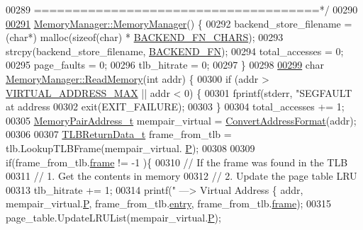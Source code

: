 \begin{DoxyCode}
{{{{{{{{{{{{{{{{{{{{{{00289 \textcolor{comment}{=====================================*/}
00290 
\hypertarget{memory_8cpp_source.tex_l00291}{}\hyperlink{classMemoryManager_ae925e8ad4d8fe6f0565e9d5729f59593}{00291} \hyperlink{classMemoryManager_ae925e8ad4d8fe6f0565e9d5729f59593}{MemoryManager::MemoryManager}() \{
00292     backend\_store\_filename = (\textcolor{keywordtype}{char}*) malloc(\textcolor{keyword}{sizeof}(\textcolor{keywordtype}{char}) * \hyperlink{memory_8h_a502fddf4e42292e4318a924b6b3b7759}{BACKEND\_FN\_CHARS});
00293     strcpy(backend\_store\_filename, \hyperlink{memory_8h_a478707addabe7b0aedaa632b70394d75}{BACKEND\_FN});
00294     total\_accesses = 0;
00295     page\_faults = 0;
00296     tlb\_hitrate = 0;
00297 \}
00298 
\hypertarget{memory_8cpp_source.tex_l00299}{}\hyperlink{classMemoryManager_a4a716fc46ee321ebb25bd54bcc9d0524}{00299} \textcolor{keywordtype}{char} \hyperlink{classMemoryManager_a4a716fc46ee321ebb25bd54bcc9d0524}{MemoryManager::ReadMemory}(\textcolor{keywordtype}{int} addr) \{
00300     \textcolor{keywordflow}{if} (addr > \hyperlink{memory_8h_a391c8595be4da3b3f1cd95918b89da2c}{VIRTUAL\_ADDRESS\_MAX} || addr < 0) \{
00301         fprintf(stderr, \textcolor{stringliteral}{"SEGFAULT at address %
00302         exit(EXIT\_FAILURE);
00303     \}
00304     total\_accesses += 1;
00305     \hyperlink{structMemoryPairAddress__t}{MemoryPairAddress\_t} mempair\_virtual = 
      \hyperlink{memory_8cpp_a90bdb77a86b4a78c22b50e250b77d9ad}{ConvertAddressFormat}(addr);
00306 
00307     \hyperlink{structTLBReturnData__t}{TLBReturnData\_t} frame\_from\_tlb = tlb.LookupTLBFrame(mempair\_virtual.
      \hyperlink{structMemoryPairAddress__t_a5bc11426b27565b959f280dd1a18b080}{P});
00308   
00309     \textcolor{keywordflow}{if}(frame\_from\_tlb.\hyperlink{structTLBReturnData__t_ac4bdfa0ee74b50048e94321426877439}{frame} != -1 )\{ 
00310         \textcolor{comment}{// If the frame was found in the TLB}
00311         \textcolor{comment}{//      1. Get the contents in memory}
00312         \textcolor{comment}{//      2. Update the page table LRU}
00313         tlb\_hitrate += 1;
00314         printf(\textcolor{stringliteral}{" ---> Virtual Address \{%
      addr, mempair\_virtual.\hyperlink{structMemoryPairAddress__t_a5bc11426b27565b959f280dd1a18b080}{P}, frame\_from\_tlb.\hyperlink{structTLBReturnData__t_a58914c8a985e6cdb2f48a56ab41a6985}{entry}, frame\_from\_tlb.\hyperlink{structTLBReturnData__t_ac4bdfa0ee74b50048e94321426877439}{frame});
00315         page\_table.UpdateLRUList(mempair\_virtual.\hyperlink{structMemoryPairAddress__t_a5bc11426b27565b959f280dd1a18b080}{P});
}}}}}}}}}}}}}}}}}}}}}}}}
\end{DoxyCode}
